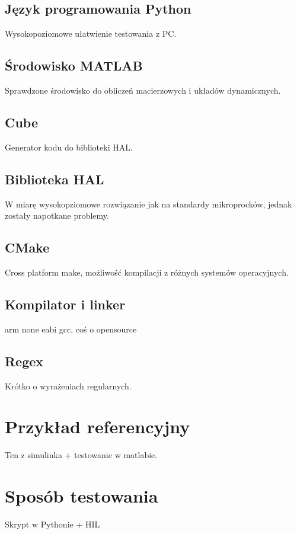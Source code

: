 \subsection{Język programowania Python} \label{sec:python}
Wysokopoziomowe ułatwienie testowania z PC.

\subsection{Środowisko MATLAB} \label{sec:matlab}
Sprawdzone środowisko do obliczeń macierzowych i układów dynamicznych.

\subsection{Cube} \label{sec:cube}
Generator kodu do biblioteki HAL.

\subsection{Biblioteka HAL} \label{sec:hal}
W miarę wysokopziomowe rozwiązanie jak na standardy mikroprocków, jednak zostały napotkane problemy.

\subsection{CMake} \label{sec:cmake}
Cross platform make, możliwość kompilacji z różnych systemów operacyjnych.

\subsection{Kompilator i linker} \label{sec:gcc}
arm none eabi gcc, coś o opensource

\subsection{Regex} \label{sec:regex}
Krótko o wyrażeniach regularnych.

\section{Przykład referencyjny} \label{sec:ref}
Ten z simulinka + testowanie w matlabie.

\section{Sposób testowania} \label{sec:tests}
Skrypt w Pythonie + HIL
